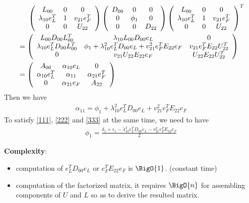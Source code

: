 \documentclass[11pt,a4paper]{article}
\begin{document}
\begin{align}
    & \hspace{0.5cm} \left( \begin{array}{ccc}
        L_{00} & 0 & 0 \\
        \lambda_{10} e_L^T & 1 & v_{21} e_F^T \\
        0 & 0 & U_{22}
    \end{array} \right)
   \left( \begin{array}{ccc}
        D_{00} & 0 & 0 \\
        0 & \phi_1 & 0 \\
        0 & 0 & D_{22}
    \end{array} \right) 
\left( \begin{array}{ccc}
        L_{00} & 0 & 0 \\
        \lambda_{10} e_L^T & 1 & v_{21} e_F^T \\
        0 & 0 & U_{22}
    \end{array} \right)^T \\
 &= 
 \left( \begin{array}{ccc}
         L_{00} D_{00} L_{00}^T & \lambda_{10} L_{00} D_{00} e_L & 0 \\
        \lambda_{10} e_L^T D_{00} L_{00}^T & \phi_1 + \lambda_{10}^2 e_L^T D_{00} e_L + v_{21}^2 e_F^T E_{22} e_F & v_{21} e_F^T E_{22} U_{22}^T \\
        0 & v_{21} U_{22} E_{22} e_F & U_{22} E_{22} U_{22}^T 
    \end{array} \right) \\
  &= \left( \begin{array}{ccc} A_{00} & \alpha_{10} e_L & 0 \\ \alpha_{10} e_L^T & \alpha_{11} & \alpha_{21} e_F^T \\ 0 & \alpha_{21} e_F & A_{22} \end{array} \right)
\end{align}
Then we have
\begin{align} \label{333}
    \alpha_{11} = \phi_1 + \lambda_{10}^2 e_L^T D_{00} e_L + v_{21}^2 e_F^T E_{22} e_F 
\end{align}
To satisfy \eqref{111}, \eqref{222} and \eqref{333} at the same time, we need to have 
\begin{align}
    \phi_1 = \frac{\delta_1 + \epsilon_1 - \lambda_{10}^2 e_L^T D_{00} e_L - v_{21}^2 e_F^T E_{22} e_F }{2}
\end{align}

\noindent
\textbf{Complexity}: 
\begin{itemize} 
    \item computation of $e_L^T D_{00} e_L$ or $e_F^T E_{22} e_F$ is
        $\BigO{1}$. (constant time)
    \item computation of the factorized matrix, it requires $\BigO{n}$ for
         assembling components of $U$ and $L$ so as to derive the resulted matrix.
\end{itemize}
\end{document}
